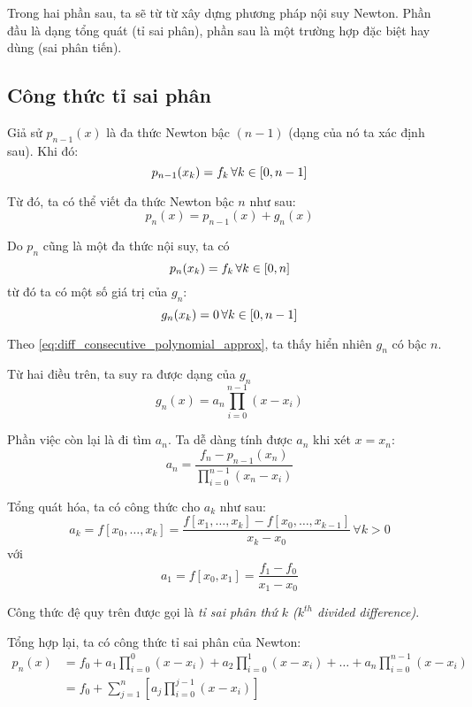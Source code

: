 \documentclass[../../Lectures]{subfiles}
\begin{document}
Trong hai phần sau, ta sẽ từ từ xây dựng phương pháp nội suy Newton. Phần đầu là
dạng tổng quát (tỉ sai phân), phần sau là một trường hợp đặc biệt hay dùng (sai
phân tiến).

\subsection{Công thức tỉ sai phân}

Giả sử \(p_{n-1}(x)\) là đa thức Newton bậc \((n - 1)\) (dạng của nó ta xác định
sau). Khi đó:
\[p_{n - 1}(x_k) = f_k \, \forall k \in \interval{0}{n - 1}\]

Từ đó, ta có thể viết đa thức Newton bậc \(n\) như sau:
\begin{equation}\label{eq:diff_consecutive_polynomial_approx}
    p_n(x) = p_{n - 1}(x) + g_n(x)
\end{equation}

Do \(p_n\) cũng là một đa thức nội suy, ta có
\[p_{n}(x_k) = f_k \, \forall k \in \interval{0}{n}\]
từ đó ta có một số giá trị của \(g_n\):
\[g_n(x_k) = 0 \, \forall k \in \interval{0}{n - 1}\]

Theo \eqref{eq:diff_consecutive_polynomial_approx}, ta thấy hiển nhiên \(g_n\)
có bậc \(n\).

Từ hai điều trên, ta suy ra được dạng của \(g_n\)
\[g_n(x) = a_n \prod_{i = 0}^{n - 1} (x - x_i)\]

Phần việc còn lại là đi tìm \(a_n\). Ta dễ dàng tính được \(a_n\) khi xét \(x =
x_n\):
\begin{equation}\label{eq:divided_diff_incremental_form}
    a_n = \frac{f_n - p_{n - 1}(x_n)}{\prod_{i = 0}^{n - 1} (x_n - x_i)}
\end{equation}

Tổng quát hóa, ta có công thức cho \(a_k\) như sau:
\[a_k = f[x_0, \ldots, x_k] = \frac{f[x_1, \ldots, x_k] - f[x_0, \ldots, x_{k - 1}]}{x_k - x_0} \, \forall k > 0\]
với
\[a_1 = f[x_0, x_1] = \frac{f_1 - f_0}{x_1 - x_0}\]

Công thức đệ quy trên được gọi là \emph{tỉ sai phân thứ \(k\) (\(k^{th}\)
divided difference)}.

Tổng hợp lại, ta có công thức tỉ sai phân của Newton:
\begin{equation}\label{eq:divided_diff}
    \begin{aligned}
        p_n(x) &= f_0 + a_1 \prod_{i = 0}^{0} (x - x_i) + a_2 \prod_{i = 0}^{1} (x - x_i) + \ldots + a_n \prod_{i = 0}^{n - 1} (x - x_i) \\
               &= f_0 + \sum_{j = 1}^{n}   \left[ a_j \prod_{i = 0}^{j - 1} (x - x_i) \right]
    \end{aligned}
\end{equation}
\end{document}
